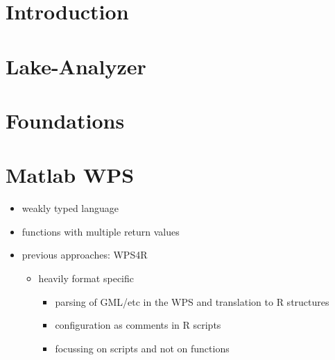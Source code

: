 \section{Introduction}
\section{Lake-Analyzer}
\section{Foundations}
\section{Matlab WPS}
	\begin{itemize}
		\item weakly typed language
		\item functions with multiple return values
		\item previous approaches: WPS4R
		\begin{itemize}
			\item heavily format specific
			\begin{itemize}
				\item parsing of GML/etc in the WPS and translation to R structures
				\item configuration as comments in R scripts
				\item focussing on scripts and not on functions
			\end{itemize}
		\end{itemize}
	\end{itemize}
